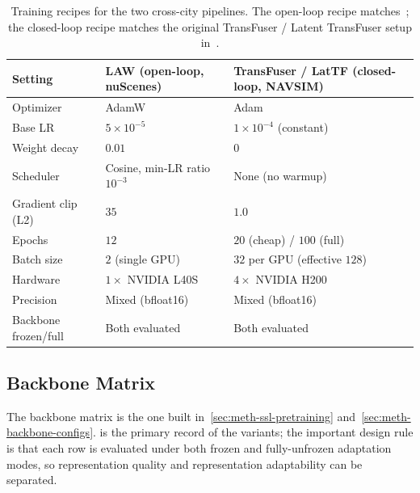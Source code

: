 \begin{table}[ht]
\centering
\caption{Training recipes for the two cross-city pipelines. The open-loop recipe matches~\cite{li-law-2024,naeinian-cross-city-2026}; the closed-loop recipe matches the original TransFuser / Latent TransFuser setup in~\cite{chitta-transfuser-2023,dauner-navsim-2024}.}
\label{tab:meth-phase1-train}
\small
\renewcommand{\arraystretch}{1.2}
\setlength{\tabcolsep}{5pt}
\begin{tabular}{@{}>{\raggedright\arraybackslash}p{3.3cm} >{\raggedright\arraybackslash}p{4.2cm} >{\raggedright\arraybackslash}p{4.6cm}@{}}
\toprule
\textbf{Setting} & \textbf{LAW (open-loop, nuScenes)} & \textbf{TransFuser / LatTF (closed-loop, NAVSIM)} \\
\midrule
Optimizer              & AdamW                            & Adam \\
Base LR                & $5 \times 10^{-5}$                & $1 \times 10^{-4}$ (constant) \\
Weight decay           & $0.01$                            & $0$ \\
Scheduler              & Cosine, min-LR ratio $10^{-3}$    & None (no warmup) \\
Gradient clip (L2)     & $35$                              & $1.0$ \\
Epochs                 & $12$                              & $20$ (cheap) / $100$ (full) \\
Batch size             & $2$ (single GPU)                  & $32$ per GPU (effective $128$) \\
Hardware               & $1 \times$ NVIDIA L40S            & $4 \times$ NVIDIA H200 \\
Precision              & Mixed (bfloat16)                  & Mixed (bfloat16) \\
Backbone frozen/full   & Both evaluated                    & Both evaluated \\
\bottomrule
\end{tabular}
\end{table}

\subsection{Backbone Matrix}
\label{sec:meth-phase1-matrix}

The backbone matrix is the one built in~\ref{sec:meth-ssl-pretraining} and~\ref{sec:meth-backbone-configs}.  is the primary record of the variants; the important design rule is that each row is evaluated under both frozen and fully-unfrozen adaptation modes, so representation quality and representation adaptability can be separated.


